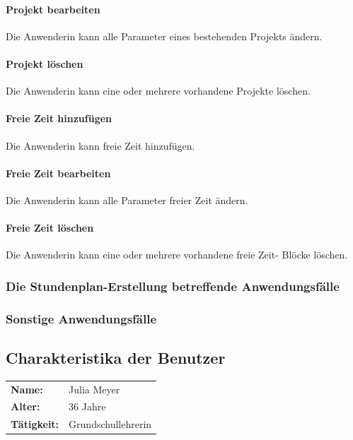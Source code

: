 \documentclass[fontsize=12pt,paper=a4,twoside]{scrartcl}
\begin{document}
\paragraph{Projekt bearbeiten}
Die Anwenderin kann alle Parameter eines bestehenden Projekts ändern.

\paragraph{Projekt löschen}
Die Anwenderin kann eine oder mehrere vorhandene Projekte löschen.

\paragraph{Freie Zeit hinzufügen}
Die Anwenderin kann freie Zeit hinzufügen.

\paragraph{Freie Zeit bearbeiten}
Die Anwenderin kann alle Parameter freier Zeit ändern.

\paragraph{Freie Zeit löschen}
Die Anwenderin kann eine oder mehrere vorhandene \glqq freie Zeit\grqq- Blöcke löschen.

\subsubsection{Die Stundenplan-Erstellung betreffende Anwendungsfälle}

\subsubsection{Sonstige Anwendungsfälle}

\subsection{Charakteristika der Benutzer}

\begin{tabular}{p{3cm}l}
\textbf{Name:} & Julia Meyer \\
\textbf{Alter:} & 36 Jahre\\
\textbf{Tätigkeit:} &  Grundschullehrerin\\
\end{tabular} \\
\end{document}
